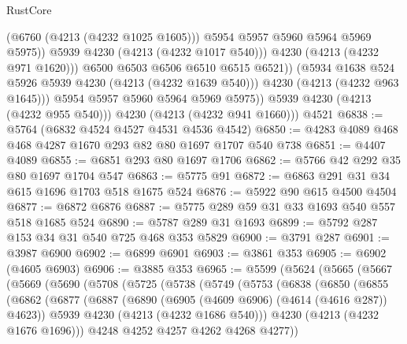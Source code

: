 \begin{lexlean}{RustCore}
\begin{coremodule}
                          (@6760 (@4213 (@4232 @1025 @1605)))
                          @5954
                          @5957
                          @5960
                          @5964
                          @5969
                          @5975))
                      @5939
                      @4230
                      (@4213 (@4232 @1017 @540)))
                    @4230
                    (@4213 (@4232 @971 @1620)))
                  @6500
                  @6503
                  @6506
                  @6510
                  @6515
                  @6521))
              (@5934 @1638 @524 @5926 @5939 @4230 (@4213 (@4232 @1639 @540)))
              @4230
              (@4213 (@4232 @963 @1645)))
            @5954
            @5957
            @5960
            @5964
            @5969
            @5975))
        @5939
        @4230
        (@4213 (@4232 @955 @540)))
      @4230
      (@4213 (@4232 @941 @1660)))
    @4521
@6838 := @5764 (@6832 @4524 @4527 @4531 @4536 @4542)
@6850 := @4283 @4089 @468 @468 @4287 @1670 @293 @82 @80 @1697 @1707 @540 @738
@6851 := @4407 @4089
@6855 := @6851 @293 @80 @1697 @1706
@6862 := @5766 @42 @292 @35 @80 @1697 @1704 @547
@6863 := @5775 @91
@6872 := @6863 @291 @31 @34 @615 @1696 @1703 @518 @1675 @524
@6876 := @5922 @90 @615 @4500 @4504
@6877 := @6872 @6876
@6887 := @5775 @289 @59 @31 @33 @1693 @540 @557 @518 @1685 @524
@6890 := @5787 @289 @31 @1693
@6899 := @5792 @287 @153 @34 @31 @540 @725 @468 @353 @5829
@6900 := @3791 @287
@6901 := @3987 @6900
@6902 := @6899 @6901
@6903 := @3861 @353
@6905 := @6902 (@4605 @6903)
@6906 := @3885 @353
@6965 := @5599
    (@5624
      (@5665
        (@5667
          (@5669
            (@5690
              (@5708
                (@5725
                  (@5738
                    (@5749
                      (@5753
                        (@6838
                          (@6850
                            (@6855
                              (@6862
                                (@6877
                                  (@6887
                                    (@6890 (@6905 (@4609 @6906) (@4614 (@4616 @287)) @4623))
                                    @5939
                                    @4230
                                    (@4213 (@4232 @1686 @540)))
                                  @4230
                                  (@4213 (@4232 @1676 @1696)))
                                @4248
                                @4252
                                @4257
                                @4262
                                @4268
                                @4277))

\end{coremodule}
\end{lexlean}
